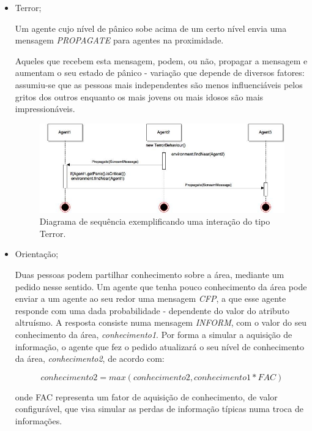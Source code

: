 \documentclass[12pt]{article}
\begin{document}
\begin{titlepage}
\begin{itemize}

\item Terror;

Um agente cujo nível de pânico sobe acima de um certo nível envia uma mensagem \textit{PROPAGATE} para agentes na proximidade.

Aqueles que recebem esta mensagem, podem, ou não, propagar a mensagem e aumentam o seu estado de pânico - variação que depende de diversos fatores: assumiu-se que as pessoas mais independentes são menos influenciáveis pelos gritos dos outros enquanto os mais jovens ou mais idosos são mais impressionáveis.\newline



\begin{figure}[H]
	\centering
	\includegraphics[scale=0.5]{terror-behaviour.jpg}
	\caption{Diagrama de sequência exemplificando uma interação do tipo Terror.}
	\label{uml}
\end{figure}

\item Orientação;

Duas pessoas podem partilhar conhecimento sobre a área, mediante um pedido nesse sentido. Um agente que tenha pouco conhecimento da área pode enviar a um agente ao seu redor uma mensagem \textit{CFP}, a que esse agente responde com uma dada probabilidade - dependente do valor do atributo altruísmo. A resposta consiste numa mensagem \textit{INFORM}, com o valor do seu conhecimento da área, \textit{conhecimento1}. Por forma a simular a aquisição de informação, o agente que fez o pedido atualizará o seu nível de conhecimento da área, \textit{conhecimento2}, de acordo com:

\[	conhecimento2 = max(conhecimento2, conhecimento1 * FAC) \]

onde FAC representa um fator de aquisição de conhecimento, de valor configurável, que visa simular as perdas de informação típicas numa troca de informações.\newline


\end{itemize}
\end{titlepage}
\end{document}
